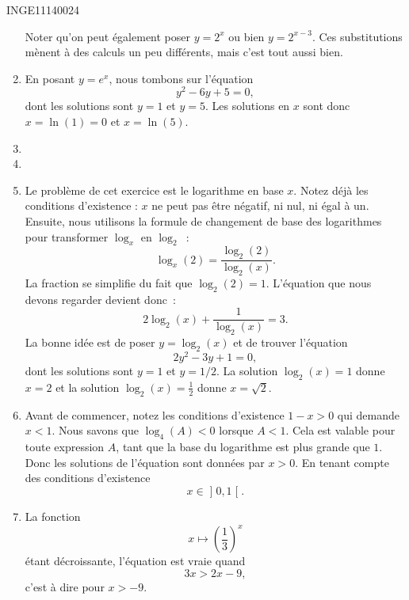 \begin{corrige}{INGE11140024}
\begin{enumerate}
			Noter qu'on peut également poser $y=2^x$ ou bien $y=2^{x-3}$. Ces substitutions mènent à des calculs un peu différents, mais c'est tout aussi bien.
		\item
			En posant $y=e^x$, nous tombons sur l'équation
			\begin{equation}
				y^2-6y+5=0,
			\end{equation}
			dont les solutions sont $y=1$ et $y=5$. Les solutions en $x$ sont donc $x=\ln(1)=0$ et $x=\ln(5)$.
		\item
		\item
		\item
			Le problème de cet exercice est le logarithme en base $x$. Notez déjà les conditions d'existence : $x$ ne peut pas être négatif, ni nul, ni égal à un. Ensuite, nous utilisons la formule de changement de base des logarithmes pour transformer $\log_x$ en $\log_2$~:
			\begin{equation}
				\log_x(2)=\frac{ \log_2(2) }{ \log_2(x) }.
			\end{equation}
			La fraction se simplifie du fait que $\log_2(2)=1$. L'équation que nous devons regarder devient donc~:
			\begin{equation}
				2\log_2(x)+\frac{1}{ \log_2(x) }=3.
			\end{equation}
			La bonne idée est de poser $y=\log_2(x)$ et de trouver l'équation
			\begin{equation}
				2y^2-3y+1=0,
			\end{equation}
			dont les solutions sont $y=1$ et $y=1/2$. La solution $\log_2(x)=1$ donne $x=2$ et la solution $\log_2(x)=\frac{1}{ 2 }$ donne $x=\sqrt{2}$.
		\item
			Avant de commencer, notez les conditions d'existence $1-x>0$ qui demande $x<1$.	Nous savons que $\log_4(A)<0$ lorsque $A<1$. Cela est valable pour toute expression $A$, tant que la base du logarithme est plus grande que $1$. Donc les solutions de l'équation sont données par $x>0$. En tenant compte des conditions d'existence
			\begin{equation}
				x\in\mathopen] 0 , 1 \mathclose[.
			\end{equation}
			
		\item
			La fonction
			\begin{equation}
				x\mapsto\left( \frac{ 1 }{ 3 } \right)^x
			\end{equation}
			étant décroissante, l'équation est vraie quand 
			\begin{equation}
				3x>2x-9,
			\end{equation}
			c'est à dire pour $x>-9$.
			

	\end{enumerate}

\end{corrige}

